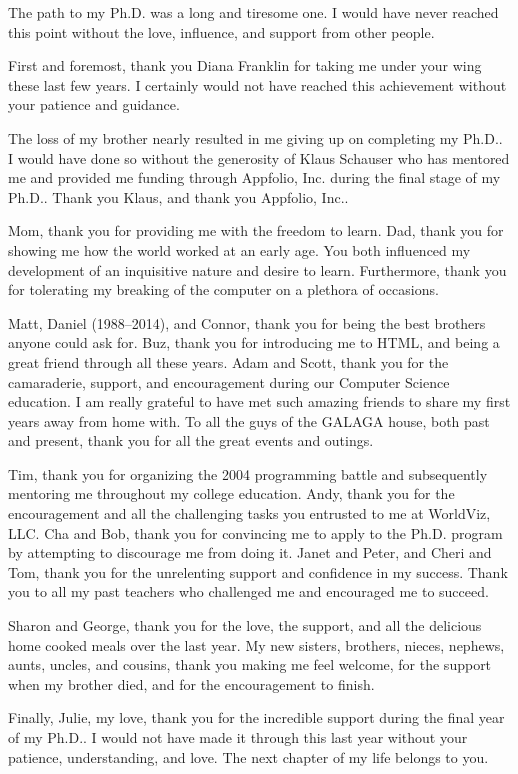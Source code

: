 \begin{acknowledgements}

The path to my Ph.D. was a long and tiresome one. I would have never reached
this point without the love, influence, and support from other people.

First and foremost, thank you Diana Franklin for taking me under your wing
these last few years. I certainly would not have reached this achievement
without your patience and guidance.

The loss of my brother nearly resulted in me giving up on completing my
Ph.D.. I would have done so without the generosity of Klaus Schauser who has
mentored me and provided me funding through Appfolio, Inc. during the final
stage of my Ph.D.. Thank you Klaus, and thank you Appfolio, Inc..

Mom, thank you for providing me with the freedom to learn. Dad, thank you for
showing me how the world worked at an early age. You both influenced my
development of an inquisitive nature and desire to learn. Furthermore, thank
you for tolerating my breaking of the computer on a plethora of occasions.

Matt, Daniel (1988--2014), and Connor, thank you for being the best brothers
anyone could ask for. Buz, thank you for introducing me to HTML, and being a
great friend through all these years. Adam and Scott, thank you for the
camaraderie, support, and encouragement during our Computer Science
education. I am really grateful to have met such amazing friends to share my
first years away from home with. To all the guys of the GALAGA house, both past
and present, thank you for all the great events and outings.

Tim, thank you for organizing the 2004 programming battle and subsequently
mentoring me throughout my college education. Andy, thank you for the
encouragement and all the challenging tasks you entrusted to me at WorldViz,
LLC. Cha and Bob, thank you for convincing me to apply to the Ph.D. program by
attempting to discourage me from doing it. Janet and Peter, and Cheri and Tom,
thank you for the unrelenting support and confidence in my success. Thank you
to all my past teachers who challenged me and encouraged me to succeed.

Sharon and George, thank you for the love, the support, and all the delicious
home cooked meals over the last year. My new sisters, brothers, nieces,
nephews, aunts, uncles, and cousins, thank you making me feel welcome, for the
support when my brother died, and for the encouragement to finish.

Finally, Julie, my love, thank you for the incredible support during the final
year of my Ph.D.. I would not have made it through this last year without your
patience, understanding, and love. The next chapter of my life belongs to you.

\end{acknowledgements}
